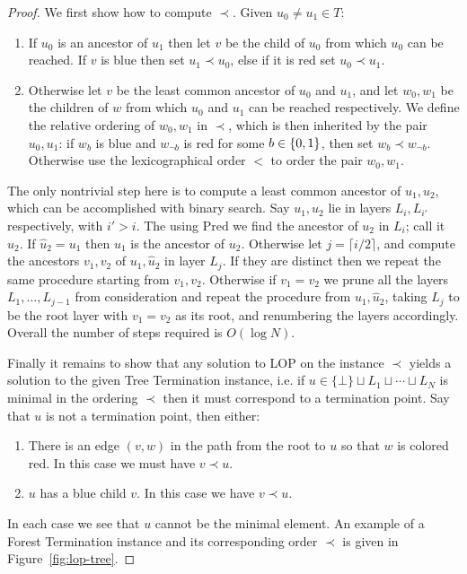 \begin{proof}
We first show how to compute $\prec$. Given $u_{0} \neq u_{1} \in T$:
\begin{enumerate}
    \item If $u_0$ is an ancestor of $u_1$ then let $v$ be the child of $u_0$ from which $u_0$ can be reached. If $v$ is blue then set $u_1 \prec u_0$, else if it is red set $u_0 \prec u_1$.
    \item Otherwise let $v$ be the least common ancestor of $u_0$ and $u_1$, and let $w_0,w_1$ be the children of $w$ from which $u_0$ and $u_1$ can be reached respectively. We define the relative ordering of $w_0,w_1$ in $\prec$, which is then inherited by the pair $u_0,u_1$: if $w_b$ is blue and $w_{\lnot b}$ is red for some $b \in \{0,1\}$, then set $w_b \prec w_{\lnot b}$. Otherwise use the lexicographical order $<$ to order the pair $w_0,w_1$.
\end{enumerate}
The only nontrivial step here is to compute a least common ancestor of $u_1,u_2$, which can be accomplished with binary search. Say $u_1,u_2$ lie in layers $L_i, L_{i'}$ respectively, with $i' > i$. The using $\mathrm{Pred}$ we find the ancestor of $u_2$ in $L_{i}$; call it $\hat{u}_2$. If $\hat{u}_2 = u_1$ then $u_1$ is the ancestor of $u_2$. Otherwise let $j = \lceil i/2 \rceil$, and compute the ancestors $v_1,v_2$ of $u_1, \hat{u}_2$ in layer $L_j$. If they are distinct then we repeat the same procedure starting from $v_1,v_2$. Otherwise if $v_1 = v_2$ we prune all the layers $L_1,\ldots,L_{j-1}$ from consideration and repeat the procedure from $u_1,\hat{u}_2$, taking $L_j$ to be the root layer with $v_1=v_2$ as its root, and renumbering the layers accordingly. Overall the number of steps required is $O(\log N)$.

Finally it remains to show that any solution to {\sc LOP} on the instance $\prec$ yields a solution to the given Tree Termination instance, i.e. if $u \in\{\bot\} \sqcup L_1 \sqcup \cdots \sqcup L_N$ is minimal in the ordering $\prec$ then it must correspond to a termination point. Say that $u$ is not a termination point, then either:
\begin{enumerate}
    \item There is an edge $(v,w)$ in the path from the root to $u$ so that $w$ is colored red. In this case we must have $v \prec u$.
    \item $u$ has a blue child $v$. In this case we have $v \prec u$.
\end{enumerate}
In each case we see that $u$ cannot be the minimal element. An example of a {\sc Forest Termination} instance and its corresponding order $\prec$ is given in Figure~\ref{fig:lop-tree}.
\end{proof}

